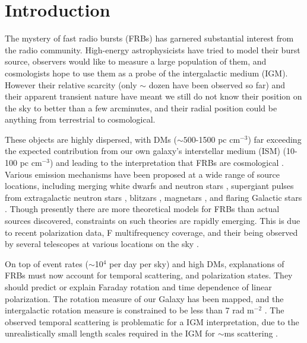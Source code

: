 \documentclass[useAMS,usenatbib]{mn2e}
\begin{document}
\newcommand{\be}{\begin{eqnarray}}
\newcommand{\ee}{\end{eqnarray}}
\newcommand{\beq}{\begin{equation}}
\newcommand{\eeq}{\end{equation}}

\section{Introduction}
The mystery of fast radio bursts (FRBs) has garnered
substantial interest from the radio community.
High-energy astrophysicists have tried to model their burst source, 
observers would like to measure a large population of them, and cosmologists
hope to use them as a probe of the intergalactic medium (IGM). However their relative scarcity 
(only $\sim$ dozen have been observed so far) and their apparent 
transient nature have meant we still do not know their position on the sky
to better than a few arcminutes, and their radial position could be anything
from terrestrial to cosmological.

These objects are
highly dispersed, with DMs ($\sim 500$-1500 pc cm$^{-3}$) far exceeding
the expected contribution from our own galaxy's interstellar medium (ISM) (10-100 pc cm$^{-3}$) and leading to the
interpretation that FRBs are cosmological \citep{2007Sci...318..777L, 2013Sci...341...53T}. 
Various emission mechanisms have been proposed 
at a wide range of source locations, 
including merging white dwarfs \citep{2013ApJ...776L..39K}
and neutron stars \citep{2013PASJ...65L..12T}, supergiant pulses 
from extragalactic neutron stars \citep{2015arXiv150100753C},
blitzars \citep{2014A&A...562A.137F}, 
magnetars \citep{2015arXiv150101341P, 2014MNRAS.442L...9L}, 
and flaring Galactic stars \citep{2014MNRAS.439L..46L}. 
Though presently there are more theoretical models for FRBs than actual 
sources discovered, constraints on such theories are rapidly emerging. 
This is due to recent polarization data, F
multifrequency coverage, and their being observed by several telescopes
at various locations on the sky \citep{2014ApJ...780L...2B, 2014arXiv1412.0342P}. 

On top of event rates ($\sim$10$^4$ per day per sky) 
and high DMs, explanations of FRBs must now
account for temporal scattering, and polarization states.  They should
predict or explain Faraday rotation and time dependence of linear polarization.
The rotation measure of our Galaxy has been mapped, and the
intergalactic rotation measure is constrained to be less than 7 rad m$^{-2}$
\citep{2015A&A...575A.118O}. 
The observed temporal scattering is problematic for a IGM interpretation, due 
to the unrealistically small length scales required in the IGM 
for $\sim$ms scattering \citep{2014ApJ...785L..26L}. 
\end{document}
